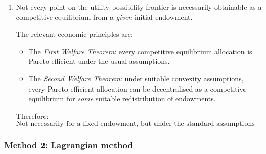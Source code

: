 \documentclass[12pt]{article}
\begin{document}
\begin{enumerate}[label=(\alph*)]
    \item
    Not every point on the utility possibility frontier is necessarily obtainable as a competitive equilibrium from a \emph{given} initial endowment.

    The relevant economic principles are:
    \begin{itemize}[leftmargin=*]
        \item The \emph{First Welfare Theorem}: every competitive equilibrium allocation is Pareto efficient under the usual assumptions.
        \item The \emph{Second Welfare Theorem}: under suitable convexity assumptions, every Pareto efficient allocation can be decentralised as a competitive equilibrium for \emph{some} suitable redistribution of endowments.
    \end{itemize}

    Therefore:
    \[
    \boxed{\text{Not necessarily for a fixed endowment, but under the standard assumptions every point on the UPF can be supported as a competitive equilibrium for some suitable redistribution of endowments.}}
    \]
\end{enumerate}

\newpage
\subsubsection{Method 2: Lagrangian method}
\end{document}
